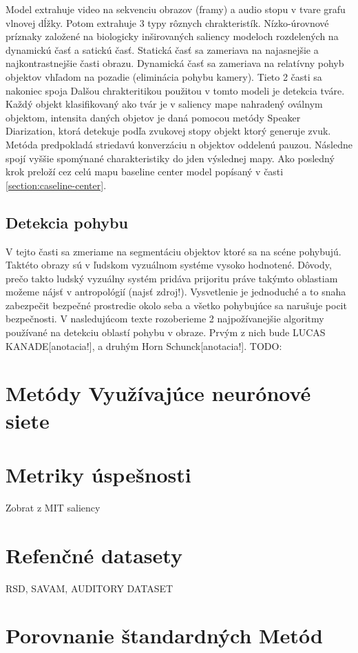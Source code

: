 Model extrahuje video na sekvenciu obrazov (framy) a audio stopu v tvare grafu vlnovej dĺžky. Potom extrahuje 3 typy rôznych chrakteristík. Nízko-úrovnové príznaky založené na biologicky inširovaných saliency modeloch rozdelených na dynamickú časť a satickú časť. Statická časť sa zameriava na najasnejšie a najkontrastnejšie časti obrazu. Dynamická časť sa zameriava na relatívny pohyb objektov vhľadom na pozadie (eliminácia pohybu kamery). Tieto 2 časti sa nakoniec spoja
Dalšou chrakteritikou použitou v tomto modeli je detekcia tváre. Každý objekt klasifikovaný ako tvár je v saliency mape nahradený oválnym objektom, intensita daných objetov je daná pomocou metódy Speaker Diarization, ktorá detekuje podľa zvukovej stopy objekt ktorý generuje zvuk. Metóda predpokladá striedavú konverzáciu n objektov oddelenú pauzou. Následne spojí vyššie spomýnané charakteristiky do jden výslednej mapy. Ako posledný krok preloží cez celú mapu baseline center model popísaný v časti \ref{section:caseline-center}.

\subsection{Detekcia pohybu}
V tejto časti sa zmeriame na segmentáciu objektov ktoré sa na scéne pohybujú. Taktéto obrazy sú v ľudskom vyzuálnom systéme vysoko hodnotené. Dôvody, prečo takto ludský vyzuálny systém pridáva prijoritu práve takýmto oblastiam možeme nájsť v antropológií (najsť zdroj!). Vysvetlenie je jednoduché a to snaha zabezpečit bezpečné prostredie okolo seba a všetko pohybujúce sa narušuje pocit bezpečnosti. V nasledujúcom texte rozoberieme 2 najpožívanejšie algoritmy používané na detekciu oblastí pohybu v obraze. Prvým z nich bude LUCAS KANADE[anotacia!], a druhým Horn Schunck[anotacia!].
TODO:

\section{Metódy Využívajúce neurónové siete}
\section{Metriky úspešnosti}
Zobrat z MIT saliency
\section{Refenčné datasety}
RSD, SAVAM, AUDITORY DATASET
\section{Porovnanie štandardných Metód}
